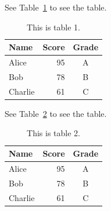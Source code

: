 See Table~\ref{tab:tablelabel01} to see the table.

\begin{table}[h!]
\centering
\caption{This is table 1.}
\begin{tabular}{lrc}
\toprule
Name & Score & Grade \\
\midrule
Alice & 95 & A \\
Bob & 78 & B \\
Charlie & 61 & C \\
\bottomrule
\end{tabular}
\label{tab:tablelabel01}
\end{table}

See Table~\ref{tab:tablelabel02} to see the table.

\begin{table}[ht]
\centering
\caption{This is table 2.}
\begin{tabular}{lrc}
\toprule
Name & Score & Grade \\
\midrule
Alice & 95 & A \\
Bob & 78 & B \\
Charlie & 61 & C \\
\bottomrule
\end{tabular}
\label{tab:tablelabel02}
\end{table}

